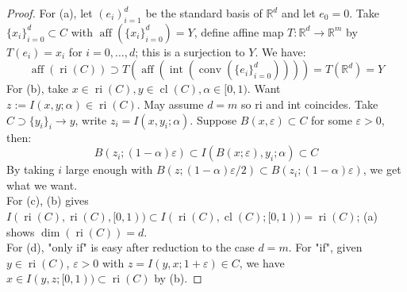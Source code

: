 \begin{proof}
	For (a), let $(e_i)_{i=1}^d$ be the standard basis of $\mathbb{R}^d$ and let $e_0=0$. Take $\{x_i\}_{i=0}^d\subset C$ with $\operatorname{aff}(\{x_i\}_{i=0}^d)=Y$, define affine map $T:\mathbb{R}^d\to \mathbb{R}^m$ by $T(e_i)=x_i$ for $i=0,\dotsc,d$; this is a surjection to $Y$. We have:
	\[
		\operatorname{aff}(\operatorname{ri}(C)) \supset T\left(\operatorname{aff}\left(\operatorname{int}\left(\operatorname{conv}\left(\{e_i\}_{i=0}^d\right)\right)\right)\right)=T(\mathbb{R}^d)=Y
	\]
	For (b), take $x\in \operatorname{ri}(C),y\in \operatorname{cl}(C), \alpha \in[0, 1)$. Want $z:=I(x, y; \alpha )\in\operatorname{ri}(C)$. May assume $d=m$ so ri and int coincides. Take $C\supset\{y_i\}_i\to y$, write $z_i=I(x,y_i;\alpha )$. Suppose $B(x,\varepsilon )\subset C$ for some $\varepsilon >0$, then:
	\[
		B(z_i;(1-\alpha )\varepsilon )\subset I(B(x;\varepsilon ),y_i;\alpha)\subset C
	\]
	By taking $i$ large enough with $B(z;(1-\alpha )\varepsilon /2)\subset B(z_i;(1-\alpha )\varepsilon )$, we get what we want.\\
	For (c), (b) gives $I(\operatorname{ri}(C),\operatorname{ri}(C),[0, 1))\subset I(\operatorname{ri}(C),\operatorname{cl}(C);[0,1))=\operatorname{ri}(C)$; (a) shows $\operatorname{dim}(\operatorname{ri}(C))=d$.\\
	For (d), "only if" is easy after reduction to the case $d=m$. For "if", given $y\in \operatorname{ri}(C)$, $\varepsilon>0$ with $z=I(y,x;1+\varepsilon )\in C$, we have $x\in I(y,z;[0,1))\subset \operatorname{ri}(C)$ by (b).
\end{proof}

